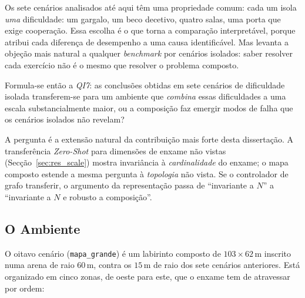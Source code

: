 Os sete cenários analisados até aqui têm uma propriedade comum: cada um isola
\emph{uma} dificuldade: um gargalo, um beco decetivo, quatro salas, uma
porta que exige cooperação. Essa escolha é o que torna a comparação
interpretável, porque atribui cada diferença de desempenho a uma causa
identificável. Mas levanta a objeção mais natural a qualquer \textit{benchmark}
por cenários isolados: saber resolver cada exercício não é o mesmo que resolver
o problema composto.

Formula-se então a \emph{QI7}: as conclusões obtidas em sete cenários de
dificuldade isolada transferem-se para um ambiente que \emph{combina} essas
dificuldades a uma escala substancialmente maior, ou a composição faz emergir
modos de falha que os cenários isolados não revelam?

A pergunta é a extensão natural da contribuição mais forte desta dissertação. A
transferência \textit{Zero-Shot} para dimensões de enxame não vistas
(Secção~\ref{sec:res_scale}) mostra invariância à \emph{cardinalidade} do
enxame; o mapa composto estende a mesma pergunta à \emph{topologia} não vista. Se
o controlador de grafo transferir, o argumento da representação passa de
``invariante a $N$'' a ``invariante a $N$ e robusto a composição''.

\subsection{O Ambiente}

O oitavo cenário (\texttt{mapa\_grande}) é um labirinto composto de
$103 \times 62$\,m inscrito numa arena de raio $60$\,m, contra os $15$\,m de
raio dos sete cenários anteriores. Está organizado em cinco zonas, de oeste para
este, que o enxame tem de atravessar por ordem:

